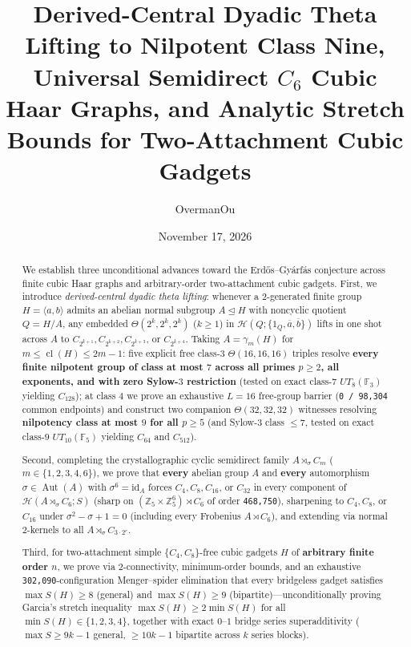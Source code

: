 \documentclass[11pt]{amsart}
\title[Derived-Central Theta Lifting, Semidirect $C_6$, and Gadget Stretch]{Derived-Central Dyadic Theta Lifting to Nilpotent Class Nine, Universal Semidirect $C_6$ Cubic Haar Graphs, and Analytic Stretch Bounds for Two-Attachment Cubic Gadgets}
\author{OvermanOu}
\date{November 17, 2026}
\theoremstyle{remark}
\newcommand{\F}{\mathbb{F}}
\newcommand{\Z}{\mathbb{Z}}
\newcommand{\Haar}{\mathcal{H}}
\newcommand{\Aut}{\operatorname{Aut}}
\newcommand{\id}{\mathrm{id}}
\newcommand{\cl}{\operatorname{cl}}
\begin{document}
\begin{abstract}
We establish three unconditional advances toward the Erd\H{o}s--Gy\'arf\'as conjecture across finite cubic Haar graphs and arbitrary-order two-attachment cubic gadgets. First, we introduce \emph{derived-central dyadic theta lifting}: whenever a $2$-generated finite group $H = \langle a, b \rangle$ admits an abelian normal subgroup $A \trianglelefteq H$ with noncyclic quotient $Q = H/A$, any embedded $\Theta(2^k, 2^k, 2^k)$ ($k \ge 1$) in $\Haar(Q; \{1_Q, \overline{a}, \overline{b}\})$ lifts in one shot across $A$ to $C_{2^{k+1}}, C_{2^{k+2}}, C_{2^{k+3}}$, or $C_{2^{k+4}}$. Taking $A = \gamma_m(H)$ for $m \le \cl(H) \le 2m - 1$: five explicit free class-$3$ $\Theta(16, 16, 16)$ triples resolve \textbf{every finite nilpotent group of class at most $7$ across all primes $p \ge 2$, all exponents, and with zero Sylow-$3$ restriction} (tested on exact class-$7$ $UT_8(\F_3)$ yielding $C_{128}$); at class $4$ we prove an exhaustive $L = 16$ free-group barrier (\texttt{0 / 98,304} common endpoints) and construct two companion $\Theta(32, 32, 32)$ witnesses resolving \textbf{nilpotency class at most $9$ for all $p \ge 5$} (and Sylow-$3$ class $\le 7$, tested on exact class-$9$ $UT_{10}(\F_5)$ yielding $C_{64}$ and $C_{512}$).

Second, completing the crystallographic cyclic semidirect family $A \rtimes_\sigma C_m$ ($m \in \{1, 2, 3, 4, 6\}$), we prove that \textbf{every} abelian group $A$ and \textbf{every} automorphism $\sigma \in \Aut(A)$ with $\sigma^6 = \id_A$ forces $C_4, C_8, C_{16}$, or $C_{32}$ in every component of $\Haar(A \rtimes_\sigma C_6; S)$ (sharp on $(\Z_5 \times \Z_5^6) \rtimes C_6$ of order \texttt{468,750}), sharpening to $C_4, C_8$, or $C_{16}$ under $\sigma^2 - \sigma + 1 = 0$ (including every Frobenius $A \rtimes C_6$), and extending via normal $2$-kernels to all $A \rtimes_\sigma C_{3 \cdot 2^r}$.

Third, for two-attachment simple $\{C_4, C_8\}$-free cubic gadgets $H$ of \textbf{arbitrary finite order $n$}, we prove via $2$-connectivity, minimum-order bounds, and an exhaustive \texttt{302,090}-configuration Menger--spider elimination that every bridgeless gadget satisfies $\max S(H) \ge 8$ (general) and $\max S(H) \ge 9$ (bipartite)---unconditionally proving Garcia's stretch inequality $\max S(H) \ge 2 \min S(H)$ for all $\min S(H) \in \{1, 2, 3, 4\}$, together with exact $0$--$1$ bridge series superadditivity ($\max S \ge 9k - 1$ general, $\ge 10k - 1$ bipartite across $k$ series blocks).
\end{abstract}
\end{document}
